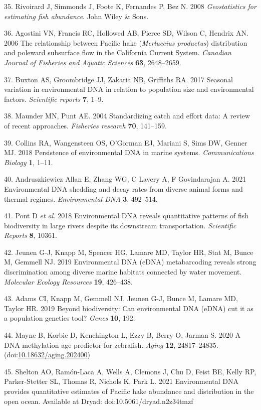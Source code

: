 \documentclass[
]{article}
\begin{document}
35. Rivoirard J, Simmonds J, Foote K, Fernandes P, Bez N. 2008
\emph{Geostatistics for estimating fish abundance}. John Wiley \& Sons.

36. Agostini VN, Francis RC, Hollowed AB, Pierce SD, Wilson C, Hendrix
AN. 2006 The relationship between Pacific hake (\textit{Merluccius productus})
distribution and poleward subsurface flow in the California Current
System. \emph{Canadian Journal of Fisheries and Aquatic Sciences}
\textbf{63}, 2648--2659.

37. Buxton AS, Groombridge JJ, Zakaria NB, Griffiths RA. 2017 Seasonal
variation in environmental DNA in relation to population size and
environmental factors. \emph{Scientific reports} \textbf{7}, 1--9.

38. Maunder MN, Punt AE. 2004 Standardizing catch and effort data: A
review of recent approaches. \emph{Fisheries research} \textbf{70},
141--159.

39. Collins RA, Wangensteen OS, O'Gorman EJ, Mariani S, Sims DW, Genner
MJ. 2018 Persistence of environmental DNA in marine systems.
\emph{Communications Biology} \textbf{1}, 1--11.

40. Andruszkiewicz Allan E, Zhang WG, C Lavery A, F Govindarajan A. 2021
Environmental DNA shedding and decay rates from diverse animal forms and
thermal regimes. \emph{Environmental DNA} \textbf{3}, 492--514.

41. Pont D \emph{et al.} 2018 Environmental DNA reveals quantitative
patterns of fish biodiversity in large rivers despite its downstream
transportation. \emph{Scientific Reports} \textbf{8}, 10361.

42. Jeunen G-J, Knapp M, Spencer HG, Lamare MD, Taylor HR, Stat M, Bunce
M, Gemmell NJ. 2019 Environmental DNA (eDNA) metabarcoding reveals
strong discrimination among diverse marine habitats connected by water
movement. \emph{Molecular Ecology Resources} \textbf{19}, 426--438.

43. Adams CI, Knapp M, Gemmell NJ, Jeunen G-J, Bunce M, Lamare MD,
Taylor HR. 2019 Beyond biodiversity: Can environmental DNA (eDNA) cut it
as a population genetics tool? \emph{Genes} \textbf{10}, 192.

44. Mayne B, Korbie D, Kenchington L, Ezzy B, Berry O, Jarman S. 2020 A
DNA methylation age predictor for zebrafish. \emph{Aging} \textbf{12},
24817--24835.
(doi:\href{https://doi.org/10.18632/aging.202400}{10.18632/aging.202400})

45. Shelton AO, Ram\'on-Laca A, Wells A, Clemons J, Chu D, Feist BE, Kelly RP,
Parker-Stetter SL, Thomas R, Nichols K, Park L. 2021 Environmental DNA provides 
quantitative estimates of Pacific hake abundance and distribution in the open ocean. Available at Dryad:
doi:10.5061/dryad.n2z34tmzf
\end{document}
